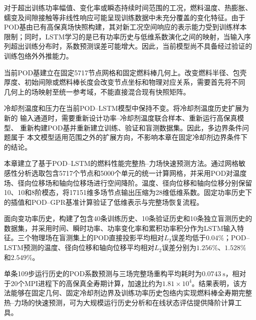 对于超出训练功率幅值、变化率或瞬态持续时间范围的工况，燃料温度、热膨胀、蠕变及间隙接触等非线性响应可能呈现训练数据中未充分覆盖的变化特征。由于POD基由已有高保真场快照构建，其对新工况空间响应的表示能力受到训练样本限制；同时，LSTM学习的是已有功率历史与低维系数演化之间的映射，当输入序列超出训练分布时，系数预测误差可能增大。因此，当前模型尚不具备经过验证的训练包络外外推能力。

当前POD基建立在固定5717节点网格和固定燃料棒几何上。改变燃料半径、包壳
厚度、初始间隙或燃料棒长度会改变节点坐标和物理对应关系，需要首先将不同
几何上的场映射至统一参考域，不能直接混合现有快照矩阵。

冷却剂温度和压力在当前POD--LSTM模型中保持不变。将冷却剂温度历史扩展为新的
输入通道时，需要重新设计功率--冷却剂温度联合样本、重新运行高保真模型、
重新构建POD基并重新建立训练、验证和盲测数据集。因此，多边界条件问题属于
本文模型适用范围之外的扩展方向，不影响本章在固定冷却剂边界条件下的结论。

本章建立了基于POD--LSTM的燃料性能完整热--力场快速预测方法。通过网格敏感性分析选取包含5717个节点和5000个单元的统一计算网格，并采用POD对温度场、径向位移场和轴向位移场进行空间降阶。温度、径向位移和轴向位移分别保留10、10和8阶模态，将17151维多场节点输出压缩为28维低维系数。固定功率历史下的插值和POD--GPR基准计算验证了低维表示与完整场恢复流程。

面向变功率历史，构建了包含40条训练历史、10条验证历史和10条独立盲测历史的数据集，并采用时间、瞬时功率、功率变化率和累积功率积分作为LSTM输入特征。三个物理场在盲测集上的POD直接投影平均相对$L_2$误差均低于$0.04\%$；POD--LSTM预测的温度、径向位移和轴向位移平均相对$L_2$误差分别为$1.256\%$、$1.528\%$和$2.549\%$。

单条109步运行历史的POD系数预测与三场完整场重构平均耗时为$0.0743~\mathrm{s}$，相对于20个MPI进程下的高保真全寿期计算，加速比约为$1.81\times10^{4}$。结果表明，该方法能够在固定几何、固定冷却剂边界及训练功率历史包络内实现燃料棒全寿期完整热--力场的快速预测，可为大规模运行历史分析和在线状态评估提供降阶计算工具。